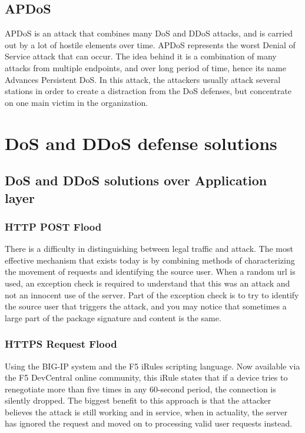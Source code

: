 \documentclass{report}
\begin{document}
 \hfill \break
\section {APDoS}

 \hfill \break APDoS is an attack that combines many DoS and DDoS attacks, and is carried out by a lot of hostile elements over time. APDoS represents the worst Denial of Service attack that can occur. The idea behind it is a combination of many attacks from multiple endpoints, and over long period of time, hence its name Advances Persistent DoS. In this attack, the attackers usually attack several stations in order to create a distraction from the DoS defenses, but concentrate on one main victim in the organization.


\chapter{DoS and DDoS defense solutions }




\section{DoS and DDoS solutions over Application layer}
 

\subsection {HTTP POST Flood}  There is a difficulty in distinguishing between legal traffic and attack.
The most effective mechanism that exists today is by combining methods of characterizing the movement of requests and identifying the source user.
When a random url is used, an exception check is required to understand that this was an attack and not an innocent use of the server. Part of the exception check is to try to identify the source user that triggers the attack, and you may notice that sometimes a large part of the package signature and content is the same.

\subsection {HTTPS Request Flood} Using the BIG-IP system and the F5 iRules scripting language.
Now available via the F5 DevCentral online community, this iRule states that if a device tries to renegotiate more than five times in any 60-second period, the connection is silently dropped.
The biggest benefit to this approach is that the attacker believes the attack is still working and in service, when in actuality, the server has ignored the request and moved on to processing valid user requests instead.
\end{document}
